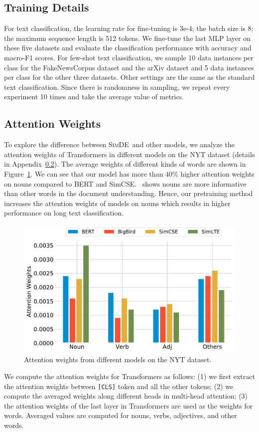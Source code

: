 \documentclass[11pt]{article}
\newcommand{\our}{\mbox{\textsc{SimDE}}}
\begin{document}
\subsection{Training Details}
\label{app:details}
For text classification, the learning rate for fine-tuning is 3e-4; the batch size is 8; the maximum sequence length is 512 tokens. 
We fine-tune the last MLP layer on these five datasets and evaluate the classification performance with accuracy and macro-F1 scores.
For few-shot text classification, we sample 10 data instances per class for the FakeNewsCorpus dataset and the arXiv dataset and 5 data instances per class for the other three datasets. 
Other settings are the same as the standard text classification. 
Since there is randomness in sampling, we repeat every experiment 10 times and take the average value of metrics.

\subsection{Attention Weights}
\label{app:attention}
To explore the difference between \our~and other models, we analyze the attention weights of Transformers in different models on the NYT dataset (details in Appendix~\ref{app:attention}). The average weights of different kinds of words are shown in Figure~\ref{attentions}.  We can see that our model has more than $40\%$ higher attention weights on nouns compared to BERT and SimCSE.~\citet{martin-johnson-2015-efficient} shows nouns are more informative than other words in the document understanding. Hence, our pretraining method increases the attention weights of models on nouns which results in higher performance on long text classification. 

\begin{figure}
\centering
\includegraphics[width=0.8\linewidth]{fig/attentions.pdf}
\caption{Attention weights from different models on the NYT dataset.}  
\label{attentions}
\end{figure}

We compute the attention weights for Transformers as follows:
(1) we first extract the attention weights between \texttt{[CLS]} token and all the other tokens;
(2) we compute the averaged weights along different heads in multi-head attention;
(3) the attention weights of the last layer in Transformers are used as the weights for words.
Averaged values are computed for nouns, verbs, adjectives, and other words.
\end{document}
